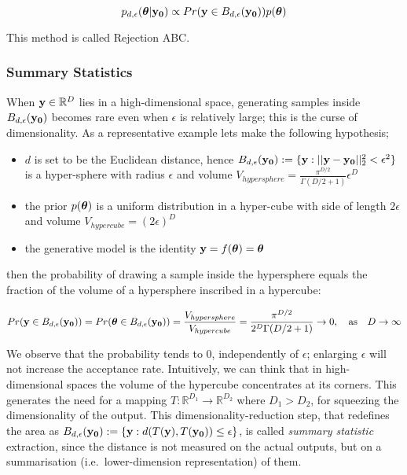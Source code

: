 \begin{equation} \label{eq:approx_posterior}
  p_{d,\epsilon}(\boldsymbol{\theta}|\mathbf{y_0}) \propto Pr(\mathbf{y} \in
  B_{d,\epsilon}(\mathbf{y_0})) p(\boldsymbol{\theta})
\end{equation}

\noindent
This method is called Rejection ABC.

\subsubsection{Summary Statistics}

When $\mathbf{y} \in \mathbb{R}^D$ lies in a high-dimensional space, generating
samples inside $B_{d,\epsilon} (\mathbf{y_0})$ becomes rare even when $\epsilon$ is
relatively large; this is the curse of dimensionality. As a
representative example lets make the following hypothesis;

\begin{itemize}
\item $d$ is set to be the Euclidean distance, hence
  $B_{d,\epsilon}(\mathbf{y_0}) := \{ \mathbf{y}: ||\mathbf{y} - \mathbf{y_0}||_2^2 < \epsilon^2 \}$ is a
  hyper-sphere with radius $\epsilon$ and volume $V_{hypersphere} = \frac{\pi^{D/2}}{\Gamma(D/2 + 1)} \epsilon^D$
\item the prior $p(\boldsymbol{\theta})$ is a uniform distribution in a hyper-cube with side of
  length $2\epsilon$ and volume $V_{hypercube} = (2\epsilon)^D$
\item the generative model is the identity $\mathbf{y}=f(\boldsymbol{\theta})= \boldsymbol{\theta} $
\end{itemize}

\noindent
then the probability of drawing a sample inside the hypersphere equals
the fraction of the volume of a hypersphere inscribed in a hypercube:

\begin{equation}
  Pr(\mathbf{y} \in B_{d,\epsilon} (\mathbf{y_0}))
  = Pr(\boldsymbol{\theta} \in B_{d,\epsilon} (\mathbf{y_0}))
  = \frac{V_{hypersphere}}{V_{hypercube}}
  = \frac{\pi^{D/2}}{2^D\Gamma(D/2 + 1)} \rightarrow 0, \quad \text{as} \quad D \rightarrow \infty
\end{equation}

\noindent
We observe that the probability tends to $0$, independently of
$\epsilon$; enlarging $\epsilon$ will not increase the acceptance
rate. Intuitively, we can think that in high-dimensional spaces the volume of the hypercube concentrates at its corners. This generates the need for a mapping
$T: \mathbb{R}^{D_1} \rightarrow \mathbb{R}^{D_2}$ where $D_1 > D_2$,
for squeezing the dimensionality of the output. This dimensionality-reduction step, that 
redefines the area as
$B_{d,\epsilon}(\mathbf{y_0}) := \{\mathbf{y}: d(T(\mathbf{y}), T(\mathbf{y_0})) \leq \epsilon \}$, is called \textit{summary statistic}
extraction, since the distance is not measured on the actual outputs,
but on a summarisation (i.e.\ lower-dimension representation) of them.

